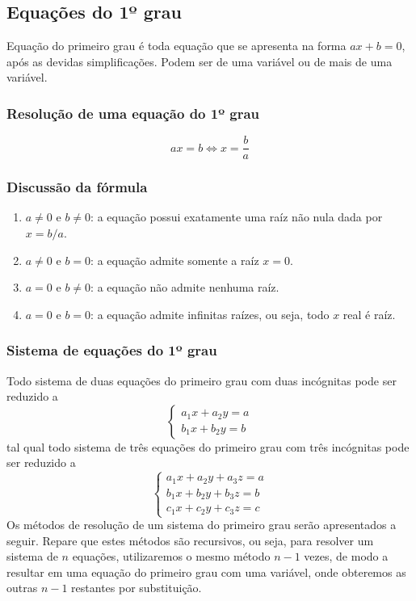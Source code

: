 \documentclass{article}
\begin{document}
\subsection{Equações do 1º grau}
Equação do primeiro grau é toda equação que se apresenta na forma $ax+b=0$, após as devidas simplificações. Podem ser de uma variável ou de mais de uma variável.

\subsubsection{Resolução de uma equação do 1º grau}
\begin{equation*}
    ax=b\Leftrightarrow x=\dfrac{b}{a}
\end{equation*}

\subsubsection{Discussão da fórmula}
\begin{enumerate}
    \item $a\neq0$ e $b\neq 0$: a equação possui exatamente uma raíz não nula dada por $x=b/a$.
    \item $a\neq0$ e $b=0$: a equação admite somente a raíz $x=0$.
    \item $a=0$ e $b\neq0$: a equação não admite nenhuma raíz.
    \item $a=0$ e $b=0$: a equação admite infinitas raízes, ou seja, todo $x$ real é raíz.
\end{enumerate}

\subsubsection{Sistema de equações do 1º grau}
Todo sistema de duas equações do primeiro grau com duas incógnitas pode ser reduzido a
\begin{equation*}
    \begin{cases}
        a_1x+a_2y=a\\
        b_1x+b_2y=b
    \end{cases}
\end{equation*}
tal qual todo sistema de três equações do primeiro grau com três incógnitas pode ser reduzido a
\begin{equation*}
    \begin{cases}
        a_1x+a_2y+a_3z=a\\
        b_1x+b_2y+b_3z=b\\
        c_1x+c_2y+c_3z=c
    \end{cases}
\end{equation*}
Os métodos de resolução de um sistema do primeiro grau serão apresentados a seguir. Repare que estes métodos são recursivos, ou seja, para resolver um sistema de $n$ equações, utilizaremos o mesmo método $n-1$ vezes, de modo a resultar em uma equação do primeiro grau com uma variável, onde obteremos as outras $n-1$ restantes por substituição.
\end{document}
